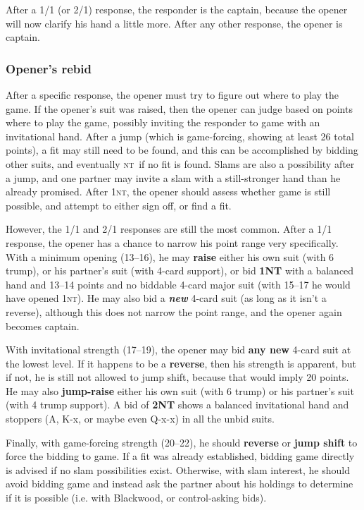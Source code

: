 \documentclass[11pt]{article}
\def\NT{\textsc{nt}}
\begin{document}
After a 1/1 (or 2/1) response, the responder is the captain, because the
opener will now clarify his hand a little more.  After any other
response, the opener is captain.

\subsubsection{Opener's rebid}

After a specific response, the opener must try to figure out where
to play the game.  If the opener's suit was raised, then the opener
can judge based on points where to play the game, possibly inviting
the responder to game with an invitational hand.  After a jump (which
is game-forcing, showing at least 26 total points), a fit may still
need to be found, and this can be accomplished by bidding other
suits, and eventually \NT\ if no fit is found.  Slams are also
a possibility after a jump, and one partner may invite a slam
with a still-stronger hand than he already promised.  After 1\NT,
the opener should assess whether game is still possible, and attempt
to either sign off, or find a fit.

However, the 1/1 and 2/1 responses are still the most common.  After a
1/1 response, the opener has a chance to narrow his point range very
specifically.  With a minimum opening (13--16), he may \textbf{raise}
either his own suit (with 6 trump), or his partner's suit (with 4-card
support), or bid \textbf{1NT} with a balanced hand and 13--14 points
and no biddable 4-card major suit (with 15--17 he would have opened
1\NT).  He may also bid a \textbf{\emph{new}} 4-card suit (as long as
it isn't a reverse), although this does not narrow the point range,
and the opener again becomes captain.

With invitational strength (17--19), the opener may bid \textbf{any
new} 4-card suit at the lowest level.  If it happens to be a \textbf{reverse},
then his strength is apparent, but if not, he is still not allowed to
jump shift, because that would imply 20 points.  He may also
\textbf{jump-raise} either his own suit (with 6 trump) or his partner's suit
(with 4 trump support).  A bid of \textbf{2NT} shows a balanced invitational
hand and stoppers (A, K-x, or maybe even Q-x-x) in all the unbid suits.

Finally, with game-forcing strength (20--22), he should
\textbf{reverse} or \textbf{jump shift} to force the bidding to game.
If a fit was already established, bidding game directly is advised if
no slam possibilities exist.  Otherwise, with slam interest, he should
avoid bidding game and instead ask the partner about his holdings to
determine if it is possible (i.e. with Blackwood, or control-asking bids).
\end{document}
